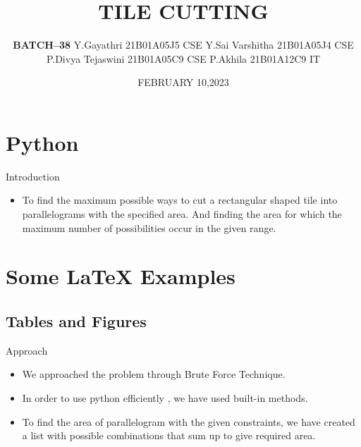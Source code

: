 \documentclass{beamer}
\title[Your Short Title]{\textbf{\Huge TILE CUTTING}}
\author{\textbf{BATCH--38}\newline\newline
Y.Gayathri 21B01A05J5 CSE\newline
Y.Sai Varshitha 21B01A05J4 CSE\newline
P.Divya Tejaswini 21B01A05C9 CSE\newline
P.Akhila 21B01A12C9 
IT\newline}
\institute{\Large Shri Vishnu Engineering College for Women}
\date{FEBRUARY 10,2023}
\begin{document}
\begin{frame}
  \titlepage
  
\end{frame}


\section{Python }

\begin{frame}{\Huge Introduction }

\begin{itemize}
\Large
  
  \item To find the maximum possible ways to cut a rectangular shaped tile into parallelograms with the specified area. And finding the area for which the maximum number of possibilities occur in the given range.
\end{itemize}

\end{frame}

\section{Some \LaTeX{} Examples}

\subsection{Tables and Figures}

\begin{frame}{\Huge Approach}

\begin{itemize}
\Large

\item We approached the problem through Brute Force Technique.
\item In order to use python efficiently , we have used built-in methods.
\item To find the area of parallelogram with the given constraints, we have created a list with possible combinations that sum up to give required area.
\end{itemize}



\end{frame}
\end{document}
